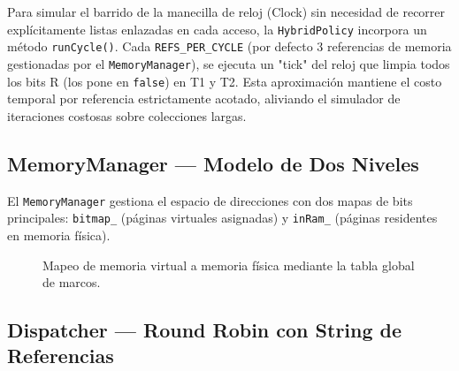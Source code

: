 \documentclass[12pt,letterpaper]{article}
\begin{document}
Para simular el barrido de la manecilla de reloj (Clock) sin necesidad de recorrer explícitamente listas enlazadas en cada acceso, la \texttt{HybridPolicy} incorpora un método \texttt{runCycle()}.
Cada \texttt{REFS\_PER\_CYCLE} (por defecto 3 referencias de memoria gestionadas por el \texttt{MemoryManager}), se ejecuta un "tick" del reloj que limpia todos los bits R (los pone en \texttt{false}) en T1 y T2.
Esta aproximación mantiene el costo temporal por referencia estrictamente acotado, aliviando el simulador de iteraciones costosas sobre colecciones largas.
\subsection{MemoryManager --- Modelo de Dos Niveles}

El \texttt{MemoryManager} gestiona el espacio de direcciones con dos mapas de bits principales: \texttt{bitmap\_} (páginas virtuales asignadas) y \texttt{inRam\_} (páginas residentes en memoria física).
\begin{figure}[H]
\centering
{}
\caption{Mapeo de memoria virtual a memoria física mediante la tabla global de marcos.}
\end{figure}\subsection{Dispatcher --- Round Robin con String de Referencias}
\end{document}
